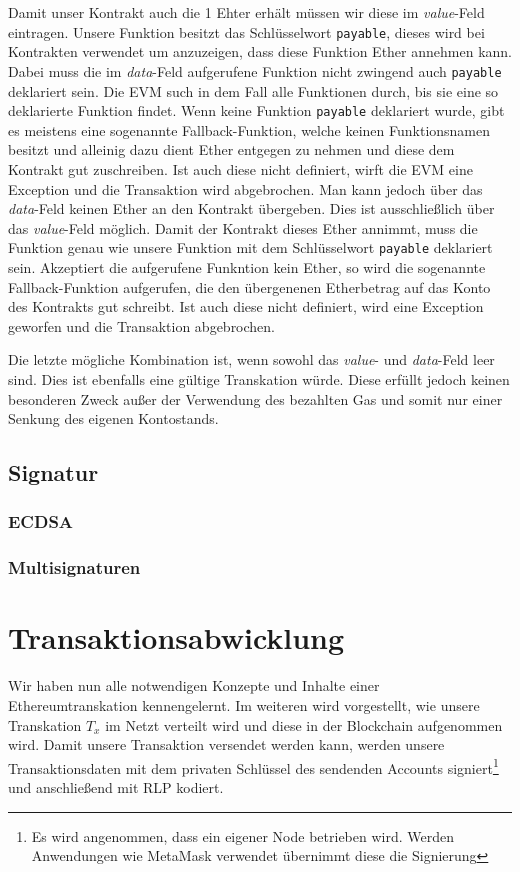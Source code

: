 \documentclass[runningheads]{llncs}
\begin{document}
Damit unser Kontrakt auch die 1 Ehter erhält müssen wir diese im \textit{value}-Feld eintragen. Unsere Funktion besitzt das Schlüsselwort \texttt{payable}, dieses wird bei Kontrakten verwendet um anzuzeigen, dass diese Funktion Ether annehmen kann. Dabei muss die im \textit{data}-Feld aufgerufene Funktion nicht zwingend auch \texttt{payable} deklariert sein. Die EVM such in dem Fall alle Funktionen durch, bis sie eine so deklarierte Funktion findet. Wenn keine Funktion \texttt{payable} deklariert wurde, gibt es meistens eine sogenannte Fallback-Funktion, welche keinen Funktionsnamen besitzt und alleinig dazu dient Ether entgegen zu nehmen und diese dem Kontrakt gut zuschreiben. Ist auch diese nicht definiert, wirft die EVM eine Exception und die Transaktion wird abgebrochen.
Man kann jedoch über das \textit{data}-Feld keinen Ether an den Kontrakt übergeben. Dies ist ausschließlich über das \textit{value}-Feld möglich. Damit der Kontrakt dieses Ether annimmt, muss die Funktion genau wie unsere Funktion mit dem Schlüsselwort \texttt{payable} deklariert sein. Akzeptiert die aufgerufene Funkntion kein Ether, so wird die sogenannte Fallback-Funktion aufgerufen, die den übergenenen Etherbetrag auf das Konto des Kontrakts gut schreibt. Ist auch diese nicht definiert, wird eine Exception geworfen und die Transaktion abgebrochen.%

Die letzte mögliche Kombination ist, wenn sowohl das \textit{value}- und \textit{data}-Feld leer sind. Dies ist ebenfalls eine gültige Transkation würde. Diese erfüllt jedoch keinen besonderen Zweck außer der Verwendung des bezahlten Gas und somit nur einer Senkung des eigenen Kontostands.
\subsection{Signatur}

\subsubsection{ECDSA}
\label{ecdsa}

\subsubsection{Multisignaturen}

\section{Transaktionsabwicklung}
Wir haben nun alle notwendigen Konzepte und Inhalte einer Ethereumtranskation kennengelernt. Im weiteren wird vorgestellt, wie unsere Transkation $T_x$ im Netzt verteilt wird und diese in der Blockchain aufgenommen wird.
Damit unsere Transaktion versendet werden kann, werden unsere Transaktionsdaten mit dem privaten Schlüssel des sendenden Accounts signiert\footnote{Es wird angenommen, dass ein eigener Node betrieben wird. Werden Anwendungen wie MetaMask verwendet übernimmt diese die Signierung} und anschließend mit RLP kodiert\cite{antonopoulos_mastering_2019}.
\end{document}
